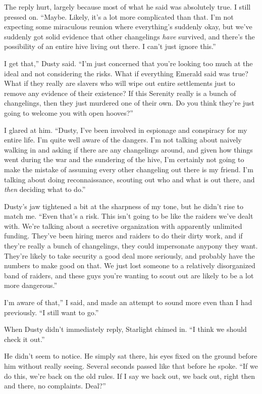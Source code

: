 The reply hurt, largely because most of what he said was absolutely true. I still pressed on. “Maybe. Likely, it’s a lot more complicated than that. I’m not expecting some miraculous reunion where everything’s suddenly okay, but we’ve suddenly got solid evidence that other changelings \textit{have} survived, and there’s the possibility of an entire hive living out there. I can’t just ignore this.”

\leavevmode{}I get that,” Dusty said. “I’m just concerned that you’re looking too much at the ideal and not considering the risks. What if everything Emerald said was true? What if they really are slavers who will wipe out entire settlements just to remove any evidence of their existence? If this Serenity really is a bunch of changelings, then they just murdered one of their own. Do you think they’re just going to welcome you with open hooves?”

I glared at him. “Dusty, I’ve been involved in espionage and conspiracy for my entire life. I’m quite well aware of the dangers. I’m not talking about naively walking in and asking if there are any changelings around, and given how things went during the war and the sundering of the hive, I’m certainly not going to make the mistake of assuming every other changeling out there is my friend. I’m talking about doing reconnaissance, scouting out who and what is out there, and \textit{then} deciding what to do.”

Dusty’s jaw tightened a bit at the sharpness of my tone, but he didn’t rise to match me. “Even that’s a risk. This isn’t going to be like the raiders we’ve dealt with. We’re talking about a secretive organization with apparently unlimited funding. They’ve been hiring mercs and raiders to do their dirty work, and if they’re really a bunch of changelings, they could impersonate anypony they want. They’re likely to take security a good deal more seriously, and probably have the numbers to make good on that. We just lost someone to a relatively disorganized band of raiders, and these guys you’re wanting to scout out are likely to be a lot more dangerous.”

\leavevmode{}I’m aware of that,” I said, and made an attempt to sound more even than I had previously. “I still want to go.”

When Dusty didn’t immediately reply, Starlight chimed in. “I think we should check it out.”

He didn’t seem to notice. He simply sat there, his eyes fixed on the ground before him without really seeing. Several seconds passed like that before he spoke. “If we do this, we’re back on the old rules. If I say we back out, we back out, right then and there, no complaints. Deal?”

